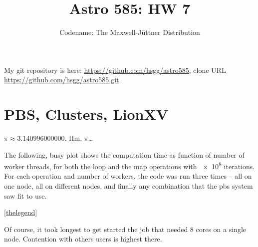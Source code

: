 \documentclass[11pt]{article}
\title{Astro 585: HW 7}
\author{Codename: The Maxwell-Jüttner Distribution}
\begin{document}
\maketitle

My git repository is here: \url{https://github.com/hsgg/astro585}, clone URL
\url{https://github.com/hsgg/astro585.git}.


\section{PBS, Clusters, LionXV}

$\pi \approx \num{3.140996000000}$. Hm, $\pi$\ldots

The following, busy plot shows the computation time as function of number of
worker threads, for both the loop and the map operations with \num{e8}
iterations. For each operation and number of workers, the code was run three
times -- all on one node, all on different nodes, and finally any combination
that the pbs system saw fit to use.

\begin{center}
  \ref{thelegend}
\end{center}

Of course, it took longest to get started the job that needed 8 cores on a
single node. Contention with others users is highest there.
\end{document}
